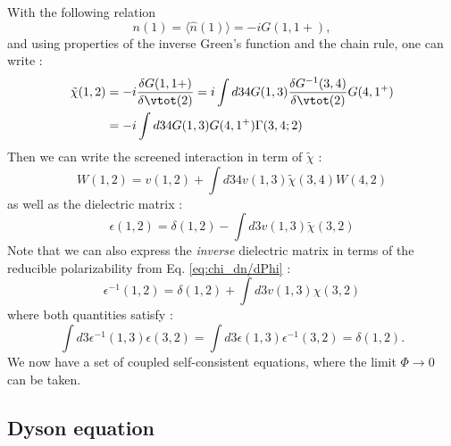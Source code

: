 With the following relation 
\begin{equation}
	n(1) = \langle \hat{n}(1)\rangle = -iG(1,1+),
\end{equation}
and using properties of the inverse Green's function and the chain rule, one can write :
\begin{align}
\begin{split}
	\tilde{\chi}(1,2) &= -i \frac{\delta G(1,1+)}{\delta \vtot(2)} = i \int d34 G(1,3)\frac{\delta G^{-1}(3,4)}{\delta \vtot(2)}G(4,1^+)\\
	&= -i \int d34 G(1,3) G(4,1^+) \Gamma(3,4;2) \label{eq:tilde_chi}
\end{split}
\end{align}
Then we can write the screened interaction in term of $\tilde{\chi}$ :
\begin{equation}
	W(1,2) = v(1,2) + \int d34v(1,3)\tilde{\chi}(3,4) W(4,2)
\end{equation}
as well as the dielectric matrix :
\begin{equation}
	\epsilon(1,2) = \delta(1,2) - \int d3 v(1,3) \tilde{\chi}(3,2)
\end{equation}
Note that we can also express the \textit{inverse} dielectric matrix in terms of the reducible polarizability from Eq. \eqref{eq:chi_dn/dPhi} :
\begin{equation}
	\epsilon^{-1}(1,2) = \delta(1,2) + \int d3 v(1,3) \chi(3,2)
\end{equation}
where both quantities satisfy :
\begin{equation}
	\int d3 \epsilon^{-1}(1,3)\epsilon(3,2) = \int d3 \epsilon(1,3)\epsilon^{-1}(3,2) = \delta(1,2).
\end{equation}
We now have a set of coupled self-consistent equations, where the limit $\Phi \to 0$ can be taken. 
%

\subsection{Dyson equation}

